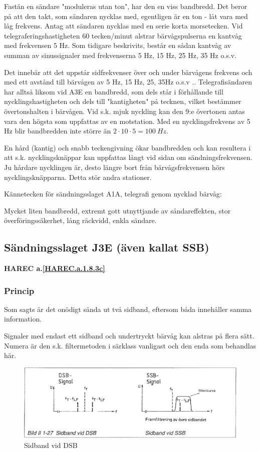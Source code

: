 Fastän en sändare "moduleras utan ton", har den en viss bandbredd. Det beror på
att den takt, som sändaren nycklas med, egentligen är en ton - låt vara med låg
frekvens. Antag att sändaren nycklas med en serie korta morsetecken. Vid
telegraferingshastigheten 60 tecken/minut alstrar bärvågspulserna en kantvåg
med frekvensen 5 Hz. Som tidigare beskrivits, består en sådan kantvåg av summan
av sinussignaler med frekvenserna 5 Hz, 15 Hz, 25 Hz, 35 Hz o.s.v.

Det innebär att det uppstår sidfrekvenser över och under bärvågens frekvens och
med ett avstånd till bärvågen av 5 Hz, 15 Hz, 25, 35Hz o.s.v ..
Telegrafisändaren har alltså liksom vid A3E en bandbredd, som dels står i
förhållande till nycklingshastigheten och dels till "kantigheten" på tecknen,
vilket bestämmer övertonshalten i bärvågen. Vid s.k. mjuk nyckling kan den 9:e
övertonen antas vara den högsta som uppfattas av en motstation. Med en
nycklingsfrekvens av 5 Hz blir bandbredden inte större än
\(2 \cdot 10 \cdot 5 = 100\ Hz\).

En hård (kantig) och snabb teckengivning ökar bandbredden och kan resultera i
att s.k. nycklingsknäppar kan uppfattas långt vid sidan om sändningsfrekvensen.
Ju hårdare nycklingen är, desto längre bort från bärvågsfrekvensen hörs
nycklingsknäpparna. Detta stör andra stationer.

Kännetecken för sändningsslaget A1A, telegrafi genom nycklad bärvåg:

Mycket liten bandbredd, extremt gott utnyttjande av såndareffekten, stor
överföringssäkerhet, lång räckvidd, enkla sändare.

\subsection{Sändningsslaget J3E (även kallat SSB)}
\textbf{HAREC a.\ref{HAREC.a.1.8.3c}\label{myHAREC.a.1.8.3c}}

\subsubsection{Princip}

Som sagts är det onödigt sända ut två sidband, eftersom båda innehåller samma
information.

Signaler med endast ett sidband och undertryckt bärvåg kan alstras på flera
sätt. Numera är den s.k. filtermetoden i särklass vanligast och den enda som
behandlas här.

\begin{figure}[ht]
\begin{center}
\includegraphics[width=14cm]{images/bild_2_1-27}
\caption{Sidband vid DSB}
\label{fig:BildII1-27}
\end{center}
\end{figure}

